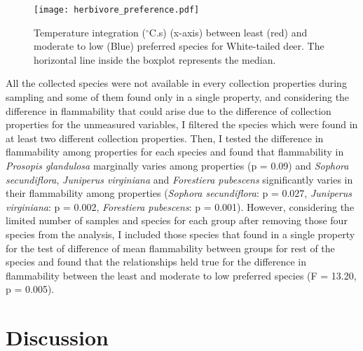 \documentclass{ttuthes2007}
\begin{document}



\begin{figure}[ht]
     \centering
     \texttt{[image: herbivore\_preference.pdf]}
     \caption{Temperature integration ($^{\circ}$C.s) (x-axis) between least (red) and moderate to low (Blue) preferred species for White-tailed deer. The horizontal line inside the boxplot represents the median.}
     \label{fig:herbivore_pref}   
 \end{figure}

All the collected species were not available in every collection properties during sampling and some of them found only in a single property, and considering the difference in flammability that could arise due to the difference of collection properties for the unmeasured variables, I filtered the species which were found in at least two different collection properties. Then, I tested the difference in flammability among properties for each species and found that flammability in \emph{Prosopis glandulosa} marginally varies among properties (p = 0.09) and \emph{Sophora secundiflora}, \emph{Juniperus virginiana} and \emph{Forestiera pubescens} significantly varies in their flammability among properties (\emph{Sophora secundiflora}: p = 0.027, \emph{Juniperus virginiana}: p = 0.002, \emph{Forestiera pubescens}: p = 0.001). However, considering the limited number of samples and species for each group after removing those four species from the analysis, I included those species that found in a single property for the test of difference of mean flammability between groups for rest of the species and found that the relationships held true for the difference in flammability between the least and moderate to low preferred species (F = 13.20, p = 0.005).\

\section{Discussion}
\end{document}
